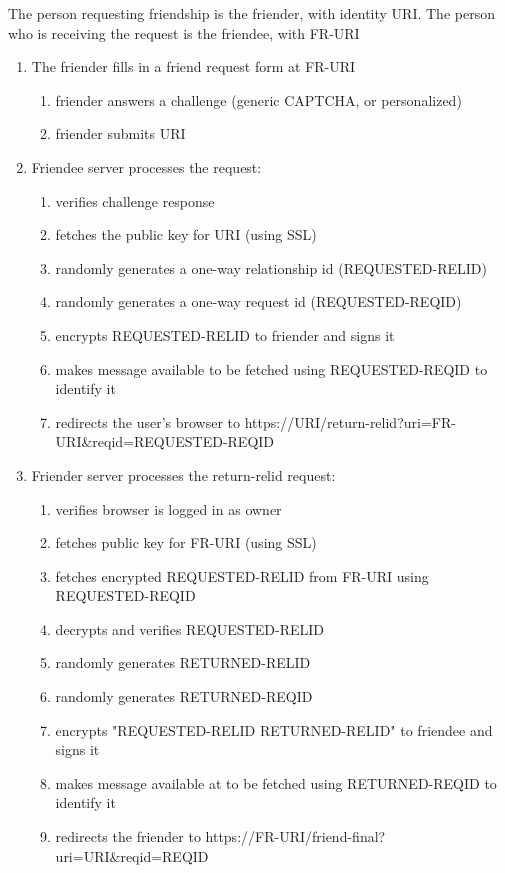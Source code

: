 \documentclass[letterpaper,11pt,oneside]{article}
\begin{document}
The person requesting friendship is the friender, with identity URI. The person
who is receiving the request is the friendee, with FR-URI

\begin{enumerate}
\item The friender fills in a friend request form at FR-URI
    \begin{enumerate}
    \item friender answers a challenge (generic CAPTCHA, or personalized)
    \item friender submits URI
    \end{enumerate}

\item Friendee server processes the request:
    \begin{enumerate}
    \item verifies challenge response
    \item fetches the public key for URI (using SSL)
    \item randomly generates a one-way relationship id (REQUESTED-RELID)
    \item randomly generates a one-way request id (REQUESTED-REQID)
    \item encrypts REQUESTED-RELID to friender and signs it
    \item makes message available to be fetched using REQUESTED-REQID to identify it
    \item redirects the user's browser to https://URI/return-relid?uri=FR-URI\&reqid=REQUESTED-REQID
    \end{enumerate}

\item Friender server processes the return-relid request:
    \begin{enumerate}
    \item verifies browser is logged in as owner
    \item fetches public key for FR-URI (using SSL)
    \item fetches encrypted REQUESTED-RELID from FR-URI using REQUESTED-REQID
    \item decrypts and verifies REQUESTED-RELID
    \item randomly generates RETURNED-RELID
    \item randomly generates RETURNED-REQID
    \item encrypts "REQUESTED-RELID RETURNED-RELID" to friendee and signs it
    \item makes message available at to be fetched using RETURNED-REQID to identify it
    \item redirects the friender to https://FR-URI/friend-final?uri=URI\&reqid=REQID
    \end{enumerate}


\end{enumerate}
\end{document}
